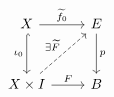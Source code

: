 \documentclass{article}
\begin{document}
    \begin{equation*}
        \begin{tikzcd}[row sep=0.4in]
            X \ar[r, "\widetilde{f}_0"] \ar[d, "\iota_0"', hookrightarrow] & E \ar[d, "p"] \\
            X\times I \ar[r, "F"] \ar[ur, "\ex\widetilde{F}", dashed] & B
        \end{tikzcd}
    \end{equation*}
\end{document}
